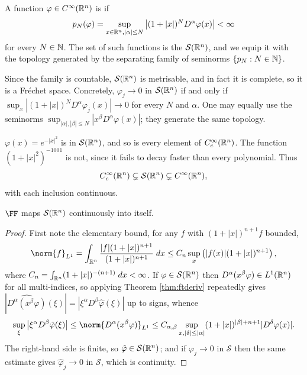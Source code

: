 \documentclass[a4paper]{scrartcl}
\newcommand{\Sch}{\mathcal{S}}
\begin{document}
\begin{definition}
	A function $\varphi \in C^\infty(\mathbb{R}^n)$ is  if
	$$p_N(\varphi) = \sup_{x \in \mathbb{R}^n, |\alpha|\le N}\left| (1+|x|)^N D^\alpha \varphi(x)\right| < \infty$$
	for every $N \in \mathbb{N}$. The set of such functions is the  $\Sch(\R^n)$, and we equip it with the topology generated by the separating family of seminorms $\{p_N : N \in \mathbb{N}\}$.
\end{definition}

Since the family is countable, $\Sch(\R^n)$ is metrisable, and in fact it is complete, so it is a Fr\'echet space. Concretely, $\varphi_j \to 0$ in $\Sch(\R^n)$ if and only if $\sup_x |(1+|x|)^N D^\alpha \varphi_j(x)|\to 0$ for every $N$ and $\alpha$. One may equally use the seminorms $\sup_{|\alpha|,|\beta|\le N}|x^\beta D^\alpha \varphi(x)|$; they generate the same topology.

\begin{example}
	$\varphi(x) = e^{-|x|^2}$ is in $\Sch(\R^n)$, and so is every element of $C_c^\infty(\mathbb{R}^n)$. The function $(1+|x|^2)^{-1001}$ is not, since it fails to decay faster than every polynomial. Thus
	$$C_c^\infty(\R^n)\subsetneq\Sch(\R^n)\subsetneq C^\infty(\R^n),$$
	with each inclusion continuous.
\end{example}

\begin{corollary}\label{cor:fschwartz}
	$\FF$ maps $\Sch(\R^n)$ continuously into itself.
\end{corollary}

\begin{proof}
	First note the elementary bound, for any $f$ with $(1+|x|)^{n+1}f$ bounded,
	$$\norm{f}_{L^1}=\int_{\R^n}\frac{|f|(1+|x|)^{n+1}}{(1+|x|)^{n+1}}\dd x \le C_n \sup_{x}\left( |f(x)|(1+|x|)^{n+1}\right),$$
	where $C_n = \int_{\mathbb{R}^n}(1+|x|)^{-(n+1)}\; d x<\infty$.
	If $\varphi \in \Sch(\R^n)$ then $D^\alpha(x^\beta\varphi) \in L^1(\mathbb{R}^n)$ for all multi-indices, so applying Theorem \ref{thm:ftderiv} repeatedly gives $\left|\widehat{D^\alpha(x^\beta \varphi)}(\xi)\right| = \left|\xi^\alpha D^\beta \hat\varphi(\xi)\right|$ up to signs, whence
	$$\sup_\xi \left| \xi^\alpha D^\beta \hat\varphi(\xi)\right| \le \norm{D^\alpha(x^\beta\varphi)}_{L^1}\le C_{\alpha,\beta}\sup_{x, |\delta|\le|\alpha|}(1+|x|)^{|\beta|+n+1}|D^\delta \varphi(x)|.$$
	The right-hand side is finite, so $\hat\varphi\in\Sch(\R^n)$; and if $\varphi_j \to 0$ in $\Sch$ then the same estimate gives $\hat\varphi_j\to 0$ in $\Sch$, which is continuity.
\end{proof}
\end{document}
